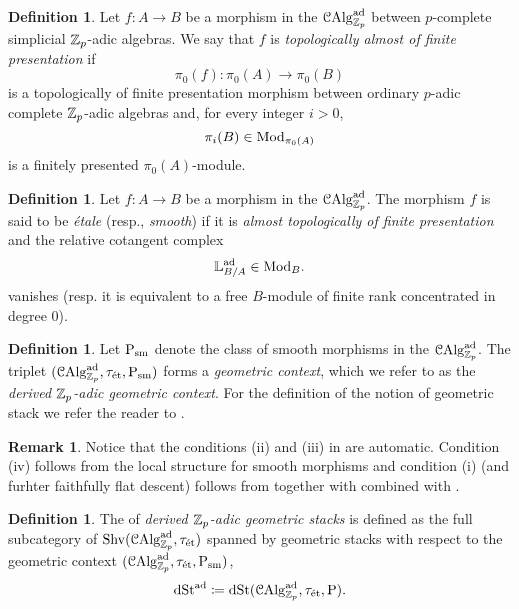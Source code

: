 \documentclass[10pt,a4paper]{amsart}
\numberwithin{equation}{subsection}
\theoremstyle{definition}
\newtheorem{remark}[theorem]{Remark}
\newtheorem{definition}[theorem]{Definition}
\begin{document}
\begin{definition}
    Let $f \colon A \to B $ be a morphism in the \infcat $\mathcal C \mathrm{Alg}^{\mathrm{ad}}_{\mathbb Z_p}$ between $p$-complete simplicial $\mathbb Z_p$-adic algebras. We say that $f$ is \emph{topologically almost of finite presentation} if
        \[
            \pi_0(f) \colon \pi_0(A) \to \pi_0(B)  
        \]
    is a topologically of finite presentation morphism between ordinary $p$-adic complete $\mathbb Z_p$-adic algebras and, for every integer $i>0$,
        \[
                \pi_i(B) \in \mathrm{Mod}_{\pi_0(A)}  
        \]
    is a finitely presented $\pi_0(A)$-module.
\end{definition}


\begin{definition}
    Let $f \colon A \to B$ be a morphism in the \infcat $\mathcal C \mathrm{Alg}^{\mathrm{ad}}_{\mathbb Z_p}$. The morphism $f$ is said to be \emph{\'etale} (resp., \emph{smooth}) if it is \emph{almost topologically of finite presentation} and the relative cotangent complex
        \[
                \mathbb{L}^{\mathrm{ad}}_{B/A} \in \mathrm{Mod}_B.   
        \]
    vanishes (resp. it is equivalent to a free $B$-module of finite rank concentrated in degree $0$).
\end{definition}


\begin{definition}
    Let $\mathrm P_{\mathrm{sm}}$ denote the class of smooth morphisms in the \infcat $\mathcal C \mathrm{Alg}^{\mathrm{ad}}_{\mathbb Z_p}$. The triplet $(\mathcal C \mathrm{Alg}^{\mathrm{ad}}_{\mathbb Z_p}, \tau_{\text{\'et}}, \mathrm P_{\mathrm{sm}})$ forms a \emph{geometric context}, which we refer to as the \emph{derived $\mathbb Z_p$-adic geometric context}. For the definition of
    the notion of geometric stack we refer the reader to \cite[Definition 2.3.1]{antonio2017moduli}.
\end{definition}

\begin{remark}
    Notice that the conditions (ii) and (iii) in \cite[Definition 2.3.1]{antonio2017moduli} are automatic. Condition (iv) follows from the local structure for smooth morphisms and
    condition (i) (and furhter faithfully flat descent) follows from \cite[Proposition 3.2.9]{antonio2018p} together with \cite[Theorem 5.15]{Lurie_Spectral_Schemes} combined with \cite[Proposition 8.1.2.1]{lurie2016spectral}.
\end{remark}

\begin{definition}
    The \infcat of \emph{derived $\mathbb Z_p$-adic geometric stacks} is defined as the full subcategory of $\mathrm{Shv}(\mathcal C \mathrm{Alg}^{\mathrm{ad}}_{\mathbb Z_p}, \tau_{\text{\'et}})$ spanned by geometric stacks with respect to the geometric context $(\mathcal C \mathrm{Alg}^{\mathrm{ad}}_{\mathbb Z_p}, \tau_{\text{\'et}}, \mathrm P_{\mathrm{sm}})$,
        \[
             \mathrm{dSt}^{\mathrm{ad}} \coloneqq \mathrm{dSt}( \mathcal C \mathrm{Alg}^{\mathrm{ad}}_{\mathbb Z_p}, \tau_{\text{\'et}}, \mathrm P).
        \]
\end{definition}
\end{document}
